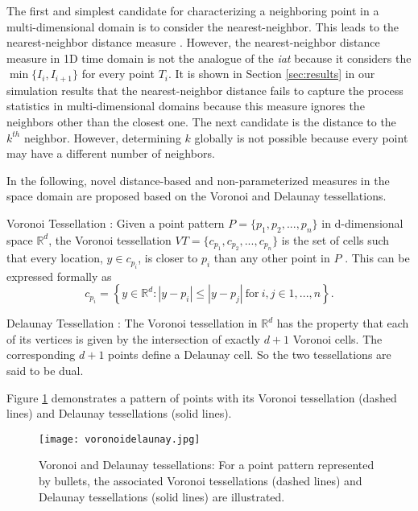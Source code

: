 \documentclass[journal]{IEEEtran}
\begin{document}
The first and simplest candidate for characterizing a neighboring point in a multi-dimensional domain is to consider the nearest-neighbor. This leads to the nearest-neighbor distance measure \cite{clark1954distance}. However, the nearest-neighbor distance measure in 1D time domain is not the analogue of the \textit{iat} because it considers the $\min \{I_{i},I_{i+1}\}$ for every point $T_{i}$. It is shown in Section \ref{sec:results} in our simulation results that the nearest-neighbor distance fails to capture the process statistics in multi-dimensional domains because this measure ignores the neighbors other than the closest one. The next candidate is the distance to the $k^{th}$ neighbor. However, determining $k$ globally is not possible because every point may have a different number of neighbors.

In the following, novel distance-based and non-parameterized measures in the space domain are proposed based on the Voronoi and Delaunay tessellations.

\begin{definition}
Voronoi Tessellation \cite[p.~1]{barr2008applications}: Given a point pattern $P = \{p_{1}, p_{2}, ... , p_{n}\}$ in d-dimensional space $\mathbb{R}^{d}$, the Voronoi tessellation $VT = \{c_{p_{1}},c_{p_{2}}, ... , c_{p_{n}}\}$ is the set of cells such that every location, $y \in c_{p_{i}}$, is closer to $p_{i}$ than any other point in $P$ . This can be expressed formally as
\begin{equation}
c_{p_{i}} = \left \{  y \in \mathbb{R}^{d} : \left | y - p_{i} \right | \leq \left | y - p_{j} \right | \ \textrm{for} \ i,j \in 1,...,n \right \}.
\end{equation}
\end{definition}

\begin{definition}
Delaunay Tessellation \cite[p.~11]{moller2007stochastic}: The Voronoi tessellation in $\mathbb{R}^{d}$ has the property that each of its vertices is given by the intersection of exactly $d + 1$ Voronoi cells. The corresponding $d + 1$ points define a Delaunay cell. So the two tessellations are said to be dual.
\end{definition}

Figure \ref{fig:voronoidelaunay} demonstrates a pattern of points with its Voronoi tessellation (dashed lines) and Delaunay tessellations (solid lines).

\begin{figure}
   \centering
   \texttt{[image: voronoidelaunay.jpg]}
   \caption{Voronoi and Delaunay tessellations: For a point pattern represented by bullets, the associated Voronoi tessellations (dashed lines) and Delaunay tessellations (solid lines) are illustrated.}
   \label{fig:voronoidelaunay}
\end{figure}
\end{document}
